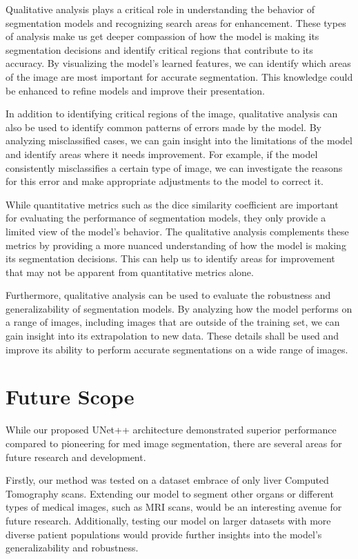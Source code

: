 \documentclass[conference]{IEEEtran}
\begin{document}
Qualitative analysis plays a critical role in understanding the behavior of segmentation models and recognizing search areas for enhancement. These types of analysis make us get deeper compassion of how the model is making its segmentation decisions and identify critical regions that contribute to its accuracy. By visualizing the model's learned features, we can identify which areas of the image are most important for accurate segmentation. This knowledge could be enhanced to refine models and improve their presentation.

In addition to identifying critical regions of the image, qualitative analysis can also be used to identify common patterns of errors made by the model. By analyzing misclassified cases, we can gain insight into the limitations of the model and identify areas where it needs improvement. For example, if the model consistently misclassifies a certain type of image, we can investigate the reasons for this error and make appropriate adjustments to the model to correct it.

While quantitative metrics such as the dice similarity coefficient are important for evaluating the performance of segmentation models, they only provide a limited view of the model's behavior. The qualitative analysis complements these metrics by providing a more nuanced understanding of how the model is making its segmentation decisions. This can help us to identify areas for improvement that may not be apparent from quantitative metrics alone.

Furthermore, qualitative analysis can be used to evaluate the robustness and generalizability of segmentation models. By analyzing how the model performs on a range of images, including images that are outside of the training set, we can gain insight into its extrapolation to new data. These details shall be used  and improve its ability to perform accurate segmentations on a wide range of images.
\section{Future Scope}
While our proposed UNet++ architecture demonstrated superior performance compared to pioneering for med image segmentation, there are several areas for future research and development.

Firstly, our method was tested on a dataset embrace of only liver Computed Tomography scans. Extending our model to segment other organs or different types of medical images, such as MRI scans, would be an interesting avenue for future research. Additionally, testing our model on larger datasets with more diverse patient populations would provide further insights into the model's generalizability and robustness.
\end{document}
